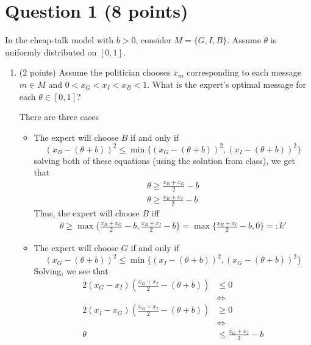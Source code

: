 \documentclass[11pt]{article}
\begin{document}
	
	
	\psetheader
    \section*{Question 1 (8 points)}
     In the cheap-talk model with $b > 0$, consider $M = \{G, I, B\}$. Assume $\theta$ is uniformly distributed on $[0, 1]$.
    \begin{enumerate}
        \item (2 points)
        Assume the politician chooses $x_m$ corresponding to each message $m \in M$ and $0 < x_G < x_I < x_B < 1$. What is the expert’s optimal message for each $\theta \in [0, 1]$?
        \begin{solution}
        There are three cases
            \begin{itemize}
                \item The expert will choose $B$ if and only if
                \[(x_B - (\theta + b))^2 \leq \min\{(x_G - (\theta + b))^2, (x_I - (\theta + b))^2\}\] solving both of these equations (using the solution from class), we get that 
                \begin{align*}
                    \theta \geq \frac{x_B + x_G}{2} - b\\
                    \theta \geq \frac{x_B + x_I}{2} - b
                \end{align*}
                Thus, the expert will choose $B$ iff
                \begin{align}
                    \boxed{\theta \geq \max\{\frac{x_B + x_G}{2} - b, \frac{x_B + x_I}{2} - b\} = \max\{\frac{x_B + x_I}{2} - b,0\} =: k'}
                 \end{align}
                \item The expert will choose $G$ if and only if 
                \[(x_G - (\theta + b))^2 \leq \min\{(x_I - (\theta + b))^2, (x_G - (\theta + b))^2\}\]
                Solving, we see that 
                \begin{align*}
                    2(x_G - x_I)(\frac{x_G + x_I}{2} - (\theta + b)) &\leq 0\\ 
                    &\iff\\ 
                    2(x_I- x_G)(\frac{x_G + x_I}{2} - (\theta + b)) &\geq 0 \\
                    &\iff\\
                    \theta &\leq \frac{x_G + x_I}{2} - b
                \end{align*}

\end{itemize}
\end{solution}
\end{enumerate}
\end{document}
